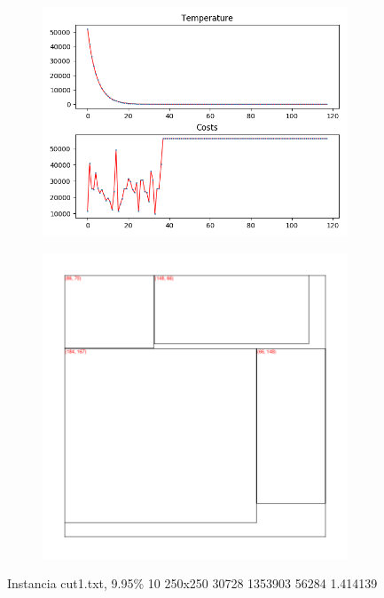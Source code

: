 \begin{figure}
\centering
\begin{subfigure}{.5\textwidth}
  \centering
  \includegraphics[width=1\linewidth]{results/cut1/1/plot}
  \label{fig:sub1}
\end{subfigure}%
\begin{subfigure}{.5\textwidth}
  \centering
  \includegraphics[width=1\linewidth]{results/cut1/1/cut}
  \label{fig:sub2}
\end{subfigure}
\caption{Instancia cut1.txt, 9.95\% 10 250x250 30728 1353903 56284 1.414139}
\label{fig:test}
\end{figure}


